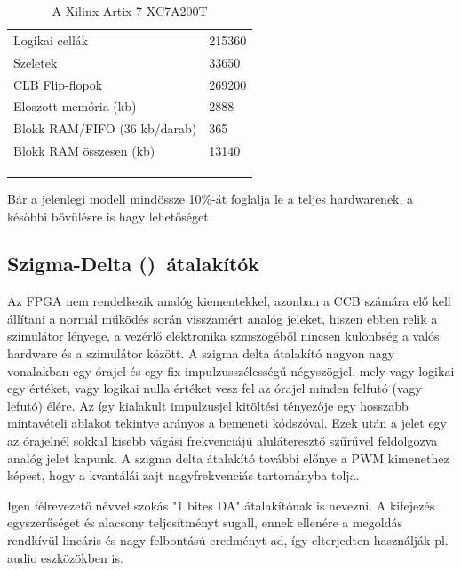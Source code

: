 \begin{table}[]
\centering
\begin{tabular}{ll}
Logikai cellák               & 215360 \\
Szeletek                     & 33650  \\
CLB Flip-flopok              & 269200 \\
Eloszott memória (kb)        & 2888   \\
Blokk RAM/FIFO (36 kb/darab) & 365    \\
Blokk RAM összesen (kb)      & 13140  \\
                             &        \\
                             &        \\
                             & 
  
\end{tabular}
\caption{A Xilinx Artix 7 XC7A200T}
\label{artix7spec}    
\end{table}

Bár a jelenlegi modell mindössze 10\%-át foglalja le a teljes hardwarenek, a későbbi bővülésre is hagy lehetőséget

\subsection{Szigma-Delta (\Sigma\Delta)\ átalakítók}

Az FPGA nem rendelkezik analóg kiementekkel, azonban a CCB számára elő kell állítani a normál működés során visszamért analóg jeleket, hiszen ebben relik a szimulátor lényege, a vezérlő elektronika szmszögéből nincsen különbség a valós hardware és a szimulátor között. A szigma delta átalakító nagyon nagy vonalakban egy órajel és egy fix impulzusszélességű négyszögjel, mely vagy logikai egy értéket, vagy logikai nulla értéket vesz fel az órajel minden felfutó (vagy lefutó) élére. Az így kialakult impulzusjel kitöltési tényezője egy hosszabb mintavételi ablakot tekintve arányos a bemeneti kódszóval. Ezek után a jelet egy az órajelnél sokkal kisebb vágási frekvenciájú aluláteresztő szűrűvel feldolgozva analóg jelet kapunk. A szigma delta átalakító további előnye a PWM kimenethez képest, hogy a kvantálái zajt nagyfrekvenciás tartományba tolja.\cite{artofelectronics}

Igen félrevezető névvel szokás "1 bites DA" átalakítónak is nevezni. A kifejezés egyszerűséget és alacsony teljesítményt sugall, ennek ellenére a megoldás rendkívül lineáris és nagy felbontású eredményt ad, így elterjedten használják pl. audio eszközökben is.

